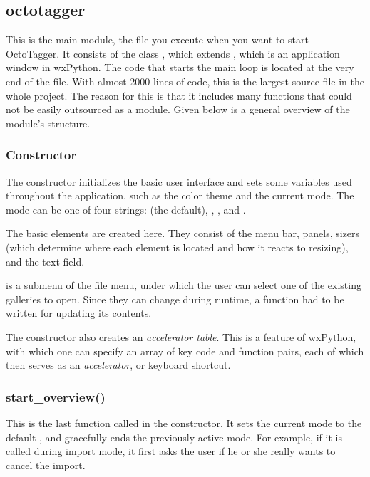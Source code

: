 \subsection{octotagger}
\def \kapitelautor {Erik Ritschl}

This is the main module, the file you execute when you want to start OctoTagger. It consists of the class , which extends , which is an application window in wxPython. The code that starts the main loop is located at the very end of the file. %
With almost 2000 lines of code, this is the largest source file in the whole project. The reason for this is that it includes many functions that could not be easily outsourced as a module. Given below is a general overview of the module's structure.

\subsubsection{Constructor}

The constructor initializes the basic user interface and sets some variables used throughout the application, such as the color theme and the current mode. The mode can be one of four strings:  (the default), , , and .

The basic elements are created here. They consist of the menu bar, panels, sizers (which determine where each element is located and how it reacts to resizing), and the text field. %

 is a submenu of the file menu, under which the user can select one of the existing galleries to open. Since they can change during runtime, a function had to be written for updating its contents.

The constructor also creates an \textit{accelerator table}. This is a feature of wxPython, with which one can specify an array of key code and function pairs, each of which then serves as an \textit{accelerator}, or keyboard shortcut. 

\subsubsection{start\_overview()}

This is the last function called in the constructor. It sets the current mode to the default , and gracefully ends the previously active mode. For example, if it is called during import mode, it first asks the user if he or she really wants to cancel the import.


